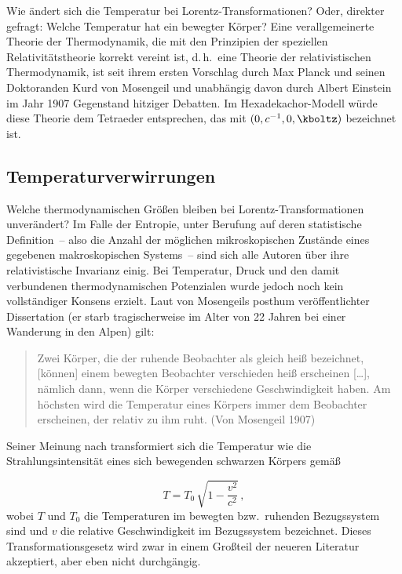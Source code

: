 
\newpage {}
\label{sec:0101}

Wie ändert sich die Temperatur bei Lorentz-Transformationen? Oder, direkter gefragt: Welche Temperatur hat ein bewegter Körper? Eine verallgemeinerte Theorie der Thermodynamik, die mit den Prinzipien der speziellen Relativitätstheorie korrekt vereint ist, d.\,h.\ eine Theorie der relativistischen Thermodynamik, ist seit ihrem ersten Vorschlag durch Max Planck und seinen Doktoranden Kurd von Mosengeil und unabhängig davon durch Albert Einstein im Jahr 1907 Gegenstand hitziger Debatten. Im Hexadekachor-Modell würde diese Theorie dem Tetraeder entsprechen, das mit $(0,c^{-1},0,\kboltz)$ bezeichnet ist.


\subsection*{Temperaturverwirrungen}

Welche thermodynamischen Größen bleiben bei Lorentz-Transformationen unverändert? Im Falle der Entropie, unter Berufung auf deren statistische Definition~-- also die Anzahl der möglichen mikroskopischen Zustände eines gegebenen makroskopischen Systems~-- sind sich alle Autoren über ihre relativistische Invarianz einig. Bei Temperatur, Druck und den damit verbundenen thermodynamischen Potenzialen wurde jedoch noch kein vollständiger Konsens erzielt. Laut von Mosengeils posthum veröffentlichter Dissertation (er starb tragischerweise im Alter von 22 Jahren bei einer Wanderung in den Alpen) gilt:

\begin{quote}
  Zwei Körper, die der ruhende Beobachter als gleich heiß bezeichnet, [können] einem bewegten Beobachter verschieden heiß erscheinen [\dots], nämlich dann, wenn die Körper verschiedene Geschwindigkeit haben. Am höchsten wird die Temperatur eines Körpers immer dem Beobachter erscheinen, der relativ zu ihm ruht. (Von Mosengeil 1907)
\end{quote}
%
Seiner Meinung nach transformiert sich die Temperatur wie die Strahlungsintensität eines sich bewegenden schwarzen Körpers gemäß

\begin{equation*}\label{reltemplower}
  T = T_0\,\sqrt{1-\frac{v^2}{c^2}}\,,
\end{equation*}
%
wobei $T$ und $T_0$ die Temperaturen im bewegten bzw.\ ruhenden Bezugssystem sind und $v$ die relative Geschwindigkeit im Bezugssystem bezeichnet. Dieses Transformationsgesetz wird zwar in einem Großteil der neueren Literatur akzeptiert, aber eben nicht durchgängig.

